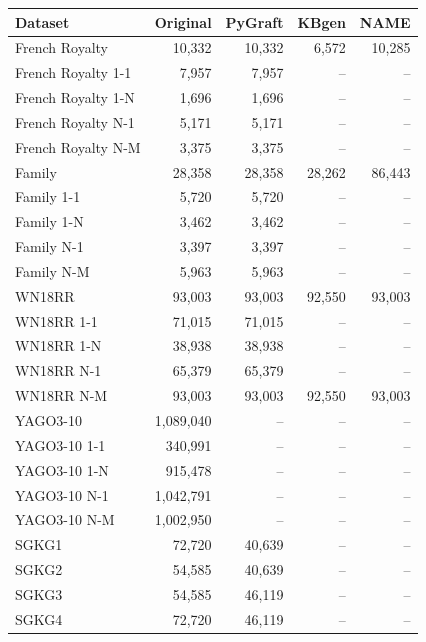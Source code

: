 \begin{tabular}{lrrrr}
\toprule
Dataset & Original & PyGraft & KBgen & NAME \\
\midrule
French Royalty & 10{,}332 & 10{,}332 & 6{,}572 & 10{,}285 \\
French Royalty 1-1 & 7{,}957 & 7{,}957 & – & – \\
French Royalty 1-N & 1{,}696 & 1{,}696 & – & – \\
French Royalty N-1 & 5{,}171 & 5{,}171 & – & – \\
French Royalty N-M & 3{,}375 & 3{,}375 & – & – \\
\midrule
Family & 28{,}358 & 28{,}358 & 28{,}262 & 86{,}443 \\
Family 1-1 & 5{,}720 & 5{,}720 & – & – \\
Family 1-N & 3{,}462 & 3{,}462 & – & – \\
Family N-1 & 3{,}397 & 3{,}397 & – & – \\
Family N-M & 5{,}963 & 5{,}963 & – & – \\
\midrule
WN18RR & 93{,}003 & 93{,}003 & 92{,}550 & 93{,}003 \\
WN18RR 1-1 & 71{,}015 & 71{,}015 & – & – \\
WN18RR 1-N & 38{,}938 & 38{,}938 & – & – \\
WN18RR N-1 & 65{,}379 & 65{,}379 & – & – \\
WN18RR N-M & 93{,}003 & 93{,}003 & 92{,}550 & 93{,}003 \\
\midrule
YAGO3-10 & 1{,}089{,}040 & – & – & – \\
YAGO3-10 1-1 & 340{,}991 & – & – & – \\
YAGO3-10 1-N & 915{,}478 & – & – & – \\
YAGO3-10 N-1 & 1{,}042{,}791 & – & – & – \\
YAGO3-10 N-M & 1{,}002{,}950 & – & – & – \\
\midrule
SGKG1 & 72{,}720 & 40{,}639 & – & – \\
SGKG2 & 54{,}585 & 40{,}639 & – & – \\
SGKG3 & 54{,}585 & 46{,}119 & – & – \\
SGKG4 & 72{,}720 & 46{,}119 & – & – \\
\bottomrule
\end{tabular}
